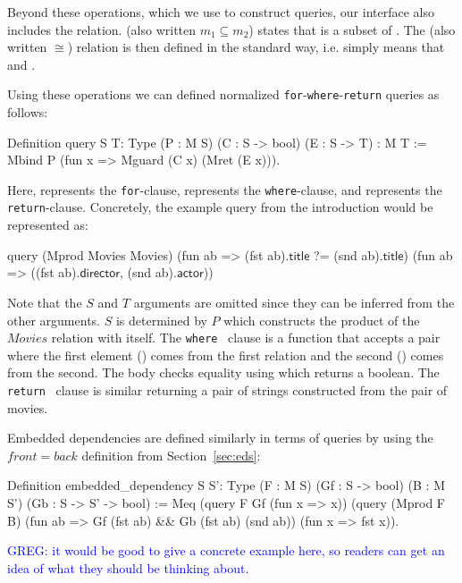 \documentclass[preprint]{sigplanconf}
\newcommand{\WHERE}{{\tt where} \ }
\newcommand{\RETURN}{{\tt return} \ }
\newcommand{\greg}[1]{\textcolor{blue}{GREG: #1}}
\newcommand{\relation}[1]{\ensuremath{\mathit{#1}}\xspace}
\begin{document}
Beyond these operations, which we use to construct queries, our interface also includes the  relation.
 (also written $m_1 \subseteq m_2$) states that  is a subset of .
The  (also written $\cong$) relation is then defined in the standard way, i.e.  simply means that  and .

Using these operations we can defined normalized {\tt for}-{\tt where}-{\tt return} queries as follows:
\begin{coq}
Definition query {S T: Type}
  (P : M S) (C : S -> bool) (E : S -> T) : M T :=
  Mbind P (fun x => Mguard (C x) (Mret (E x))).
\end{coq}
Here,  represents the {\tt for}-clause,  represents the {\tt where}-clause, and  represents the {\tt return}-clause.
Concretely, the example query from the introduction would be represented as:
\begin{coq}
query (Mprod Movies Movies)
      (fun ab => (fst ab).$\textsf{title}$ ?= (snd ab).$\textsf{title}$)
      (fun ab => ((fst ab).$\textsf{director}$, (snd ab).$\textsf{actor}$))
\end{coq}
Note that the $S$ and $T$ arguments are omitted since they can be inferred from the other arguments.
$S$ is determined by $P$ which constructs the product of the \relation{Movies} relation with itself.
The \WHERE clause is a function that accepts a pair where the first element () comes from the first relation and the second () comes from the second.
The body checks equality using  which returns a boolean.
The \RETURN clause is similar returning a pair of strings constructed from the pair of movies.

Embedded dependencies are defined similarly in terms of queries by using the $front = back$ definition from Section~\ref{sec:eds}:
\begin{coq}
Definition embedded_dependency {S S': Type}
  (F : M S) (Gf : S -> bool) (B : M S') (Gb : S -> S' -> bool)
:= Meq (query F Gf (fun x => x))
       (query (Mprod F B)
              (fun ab => Gf (fst ab) && Gb (fst ab) (snd ab))
              (fun x => fst x)).
\end{coq}

\greg{it would be good to give a concrete example here, so readers can get an idea of what they should be thinking about.}
\end{document}
